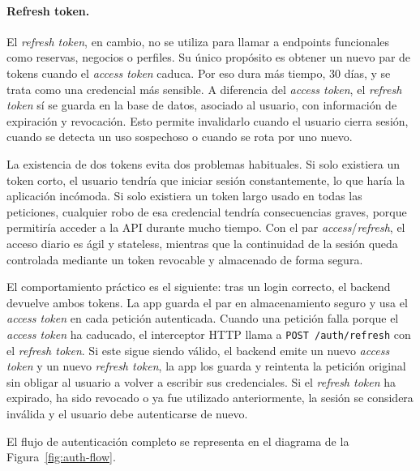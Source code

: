 \documentclass[12pt,a4paper,twoside]{report}
\begin{document}
\paragraph{Refresh token.} El \textit{refresh token}, en cambio, no se utiliza
para llamar a endpoints funcionales como reservas, negocios o perfiles. Su
único propósito es obtener un nuevo par de tokens cuando el \textit{access
token} caduca. Por eso dura más tiempo, 30 días, y se trata como una credencial
más sensible. A diferencia del \textit{access token}, el \textit{refresh token}
sí se guarda en la base de datos, asociado al usuario, con información de
expiración y revocación. Esto permite invalidarlo cuando el usuario cierra
sesión, cuando se detecta un uso sospechoso o cuando se rota por uno nuevo.

La existencia de dos tokens evita dos problemas habituales. Si solo existiera
un token corto, el usuario tendría que iniciar sesión constantemente, lo que
haría la aplicación incómoda. Si solo existiera un token largo usado en todas
las peticiones, cualquier robo de esa credencial tendría consecuencias graves,
porque permitiría acceder a la API durante mucho tiempo. Con el par
\textit{access}/\textit{refresh}, el acceso diario es ágil y stateless, mientras
que la continuidad de la sesión queda controlada mediante un token revocable y
almacenado de forma segura.

El comportamiento práctico es el siguiente: tras un login correcto, el backend
devuelve ambos tokens. La app guarda el par en almacenamiento seguro y usa el
\textit{access token} en cada petición autenticada. Cuando una petición falla
porque el \textit{access token} ha caducado, el interceptor HTTP llama a
\texttt{POST /auth/refresh} con el \textit{refresh token}. Si este sigue siendo
válido, el backend emite un nuevo \textit{access token} y un nuevo
\textit{refresh token}, la app los guarda y reintenta la petición original sin
obligar al usuario a volver a escribir sus credenciales. Si el \textit{refresh
token} ha expirado, ha sido revocado o ya fue utilizado anteriormente, la sesión
se considera inválida y el usuario debe autenticarse de nuevo.

El flujo de autenticación completo se representa en el diagrama de la Figura~\ref{fig:auth-flow}.
\end{document}
